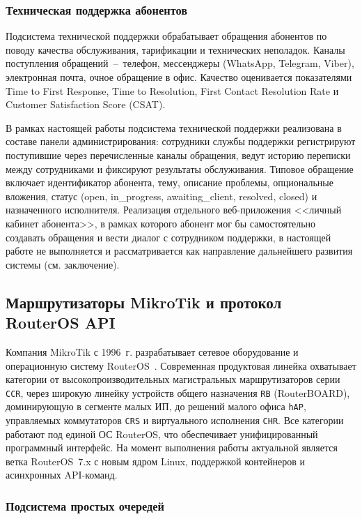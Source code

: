 \subsubsection{Техническая поддержка абонентов}

Подсистема технической поддержки обрабатывает обращения абонентов по поводу качества обслуживания, тарификации и технических неполадок. Каналы поступления обращений~--~телефон, мессенджеры (WhatsApp, Telegram, Viber), электронная почта, очное обращение в офис. Качество оценивается показателями Time to First Response, Time to Resolution, First Contact Resolution Rate и Customer Satisfaction Score (CSAT).

В рамках настоящей работы подсистема технической поддержки реализована в составе панели администрирования: сотрудники службы поддержки регистрируют поступившие через перечисленные каналы обращения, ведут историю переписки между сотрудниками и фиксируют результаты обслуживания. Типовое обращение включает идентификатор абонента, тему, описание проблемы, опциональные вложения, статус (open, in\_progress, awaiting\_client, resolved, closed) и назначенного исполнителя. Реализация отдельного веб-приложения <<личный кабинет абонента>>, в рамках которого абонент мог бы самостоятельно создавать обращения и вести диалог с сотрудником поддержки, в настоящей работе не выполняется и рассматривается как направление дальнейшего развития системы (см. заключение).

\subsection{Маршрутизаторы MikroTik и протокол RouterOS API}

Компания MikroTik с 1996~г. разрабатывает сетевое оборудование и операционную систему RouterOS~\cite{mikrotikwiki}. Современная продуктовая линейка охватывает категории от высокопроизводительных магистральных маршрутизаторов серии \texttt{CCR}, через широкую линейку устройств общего назначения \texttt{RB} (RouterBOARD), доминирующую в сегменте малых ИП, до решений малого офиса \texttt{hAP}, управляемых коммутаторов \texttt{CRS} и виртуального исполнения \texttt{CHR}. Все категории работают под единой ОС RouterOS, что обеспечивает унифицированный программный интерфейс. На момент выполнения работы актуальной является ветка RouterOS~7.x с новым ядром Linux, поддержкой контейнеров и асинхронных API-команд.

\subsubsection{Подсистема простых очередей}

